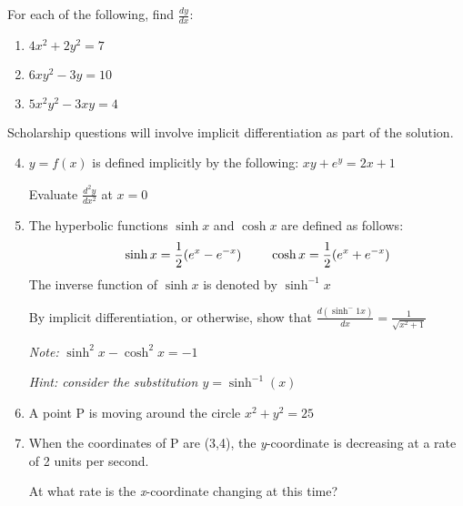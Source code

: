 \documentclass[../main.tex]{subfiles}
\begin{document}
For each of the following, find \(\frac{dy}{dx}\):
\begin{enumerate}
    \item \(4x^2 +2y^2 = 7\) 
    
    \item \(6xy^2 - 3y=10\) 
    
    \item \(5x^2y^2 -3xy=4\) 
    
\end{enumerate}
Scholarship questions will involve implicit differentiation as part of the solution.
\begin{enumerate}
    \setcounter{enumi}{3}
    \item \(y=f(x)\) is defined implicitly by the following: \(xy+e^y=2x+1\)
    
    Evaluate \( \frac{d^2y}{dx^2}\) at \(x=0\)

    \item The hyperbolic functions \(\sinh{x}\) and \(\cosh{x}\) are defined as follows:
    \begin{align*}
        &\hspace{0.5cm} \sinh{x}=\frac{1}{2}(e^x-e^{-x}) 
        &\hspace{0.5cm} \cosh{x}=\frac{1}{2}(e^x+e^{-x}) 
    \end{align*}    
    The inverse function of \(\sinh{x}\) is denoted by \(\sinh^{-1}{x}\)

    By implicit differentiation, or otherwise, show that \( \frac{d(\sinh^-1x)}{dx}=\frac{1}{\sqrt{x^2+1}}\)

    \textit{Note:} \(\sinh^2{x}-\cosh^2{x}=-1\)

    \textit{Hint: consider the substitution \(y=\sinh^{-1}(x)\)}

    \item A point P is moving around the circle \(x^2+y^2=25\)
    \item 
    When the coordinates of P are (3,4), the \textit{y}-coordinate is decreasing at a rate of 2 units per second.

    At what rate is the \textit{x}-coordinate changing at this time?
\end{enumerate}

\pagebreak
\end{document}
